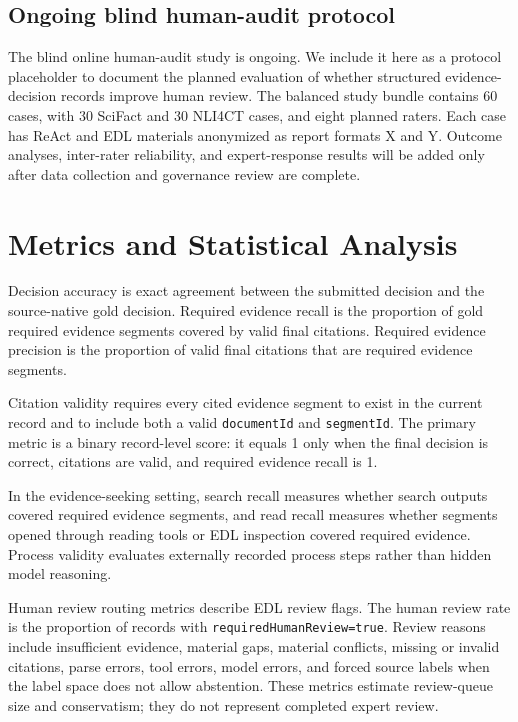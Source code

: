\documentclass[11pt,a4paper]{article}
\begin{document}
\subsection{Ongoing blind human-audit protocol}

The blind online human-audit study is ongoing. We include it here as a protocol placeholder to document the planned evaluation of whether structured evidence-decision records improve human review. The balanced study bundle contains 60 cases, with 30 SciFact and 30 NLI4CT cases, and eight planned raters. Each case has ReAct and EDL materials anonymized as report formats X and Y. Outcome analyses, inter-rater reliability, and expert-response results will be added only after data collection and governance review are complete.

\section{Metrics and Statistical Analysis}

Decision accuracy is exact agreement between the submitted decision and the source-native gold decision. Required evidence recall is the proportion of gold required evidence segments covered by valid final citations. Required evidence precision is the proportion of valid final citations that are required evidence segments.

Citation validity requires every cited evidence segment to exist in the current record and to include both a valid \texttt{documentId} and \texttt{segmentId}. The primary metric is a binary record-level score: it equals 1 only when the final decision is correct, citations are valid, and required evidence recall is 1.

In the evidence-seeking setting, search recall measures whether search outputs covered required evidence segments, and read recall measures whether segments opened through reading tools or EDL inspection covered required evidence. Process validity evaluates externally recorded process steps rather than hidden model reasoning.

Human review routing metrics describe EDL review flags. The human review rate is the proportion of records with \texttt{requiredHumanReview=true}. Review reasons include insufficient evidence, material gaps, material conflicts, missing or invalid citations, parse errors, tool errors, model errors, and forced source labels when the label space does not allow abstention. These metrics estimate review-queue size and conservatism; they do not represent completed expert review.
\end{document}
